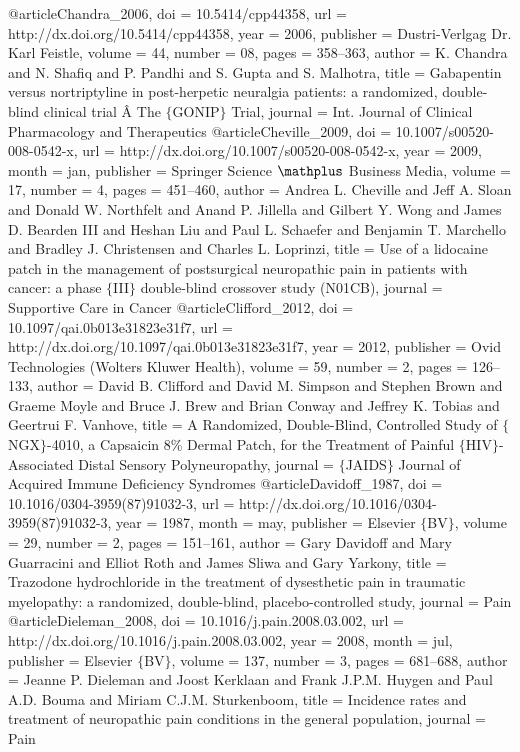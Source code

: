 @article{Chandra_2006,
	doi = {10.5414/cpp44358},
	url = {http://dx.doi.org/10.5414/cpp44358},
	year = 2006,
	publisher = {Dustri-Verlgag Dr. Karl Feistle},
	volume = {44},
	number = {08},
	pages = {358--363},
	author = {K. Chandra and N. Shafiq and P. Pandhi and S. Gupta and S. Malhotra},
	title = {Gabapentin versus nortriptyline in post-herpetic neuralgia patients: a randomized, double-blind clinical trial Â The $\lbrace$GONIP$\rbrace$ Trial},
	journal = {Int. Journal of Clinical Pharmacology and Therapeutics}
}
@article{Cheville_2009,
	doi = {10.1007/s00520-008-0542-x},
	url = {http://dx.doi.org/10.1007/s00520-008-0542-x},
	year = 2009,
	month = {jan},
	publisher = {Springer Science $\mathplus$ Business Media},
	volume = {17},
	number = {4},
	pages = {451--460},
	author = {Andrea L. Cheville and Jeff A. Sloan and Donald W. Northfelt and Anand P. Jillella and Gilbert Y. Wong and James D. Bearden III and Heshan Liu and Paul L. Schaefer and Benjamin T. Marchello and Bradley J. Christensen and Charles L. Loprinzi},
	title = {Use of a lidocaine patch in the management of postsurgical neuropathic pain in patients with cancer: a phase $\lbrace$III$\rbrace$ double-blind crossover study (N01CB)},
	journal = {Supportive Care in Cancer}
}
@article{Clifford_2012,
	doi = {10.1097/qai.0b013e31823e31f7},
	url = {http://dx.doi.org/10.1097/qai.0b013e31823e31f7},
	year = 2012,
	publisher = {Ovid Technologies (Wolters Kluwer Health)},
	volume = {59},
	number = {2},
	pages = {126--133},
	author = {David B. Clifford and David M. Simpson and Stephen Brown and Graeme Moyle and Bruce J. Brew and Brian Conway and Jeffrey K. Tobias and Geertrui F. Vanhove},
	title = {A Randomized, Double-Blind, Controlled Study of $\lbrace$NGX$\rbrace$-4010, a Capsaicin 8{\%} Dermal Patch, for the Treatment of Painful $\lbrace$HIV$\rbrace$-Associated Distal Sensory Polyneuropathy},
	journal = {$\lbrace$JAIDS$\rbrace$ Journal of Acquired Immune Deficiency Syndromes}
}
@article{Davidoff_1987,
	doi = {10.1016/0304-3959(87)91032-3},
	url = {http://dx.doi.org/10.1016/0304-3959(87)91032-3},
	year = 1987,
	month = {may},
	publisher = {Elsevier $\lbrace$BV$\rbrace$},
	volume = {29},
	number = {2},
	pages = {151--161},
	author = {Gary Davidoff and Mary Guarracini and Elliot Roth and James Sliwa and Gary Yarkony},
	title = {Trazodone hydrochloride in the treatment of dysesthetic pain in traumatic myelopathy: a randomized, double-blind, placebo-controlled study},
	journal = {Pain}
}
@article{Dieleman_2008,
	doi = {10.1016/j.pain.2008.03.002},
	url = {http://dx.doi.org/10.1016/j.pain.2008.03.002},
	year = 2008,
	month = {jul},
	publisher = {Elsevier $\lbrace$BV$\rbrace$},
	volume = {137},
	number = {3},
	pages = {681--688},
	author = {Jeanne P. Dieleman and Joost Kerklaan and Frank J.P.M. Huygen and Paul A.D. Bouma and Miriam C.J.M. Sturkenboom},
	title = {Incidence rates and treatment of neuropathic pain conditions in the general population},
	journal = {Pain}
}
